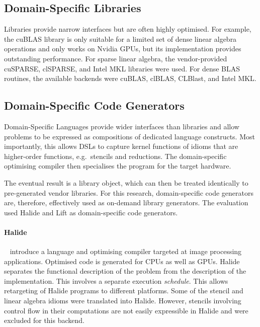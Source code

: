 \subsection{Domain-Specific Libraries}

    Libraries provide narrow interfaces but are often highly optimised.
    For example, the cuBLAS library is only suitable for a limited set of dense
    linear algebra operations and only works on Nvidia GPUs, but its
    implementation provides outstanding performance.
    For sparse linear algebra, the vendor-provided cuSPARSE, clSPARSE, and
    Intel MKL libraries were used.
    For dense BLAS routines, the available backends were cuBLAS, clBLAS,
    CLBlast, and Intel MKL.

\subsection{Domain-Specific Code Generators}

    Domain-Specific Languages provide wider interfaces than libraries and allow
    problems to be expressed as compositions of dedicated language constructs.
    Most importantly, this allows DSLs to capture kernel functions of idioms
    that are higher-order functions, e.g.\ stencils and reductions.
    The domain-specific optimising compiler then specialises the program for the
    target hardware.

    The eventual result is a library object, which can then be treated
    identically to pre-generated vendor libraries.
    For this research,  domain-specific code generators are, therefore,
    effectively used as on-demand library generators.
    The evaluation used Halide and Lift as domain-specific code generators.

    \paragraph*{Halide}~\citet{Ragan-Kelley2013Halide} introduce a language and
    optimising compiler targeted at image processing applications.
    Optimised code is generated for CPUs as well as GPUs.
    Halide separates the functional description of the problem from the
    description of the implementation.
    This involves a separate execution \emph{schedule}.
    This allows retargeting of Halide programs to different platforms.
    Some of the stencil and linear algebra idioms were translated into Halide.
    However, stencils involving control flow in their computations are not
    easily expressible in Halide and were excluded for this backend.

